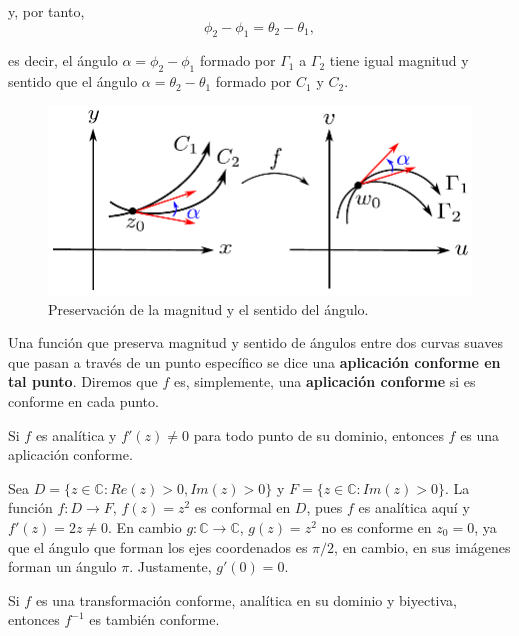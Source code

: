 y, por tanto,
$$\phi_2 - \phi_1 = \theta_2 - \theta_1,$$

es decir, el ángulo $\alpha = \phi_2 - \phi_1$ formado por $\Gamma_1$ a $\Gamma_2$ tiene igual magnitud y sentido que el ángulo $\alpha = \theta_2 - \theta_1$ formado por $C_1$ y $C_2$.

\begin{figure}[H]
    \centering
    \includegraphics[scale = 0.75]{Figuras/MapeoConforme2.pdf}
    \caption{Preservación de la magnitud y el sentido del ángulo.}
    \label{fig:Conforme2}
\end{figure}

\begin{defi}
Una función que preserva magnitud y sentido de ángulos entre dos curvas suaves que pasan a través de un punto específico se dice una \textbf{aplicación conforme en tal punto}. Diremos que $f$ es, simplemente, una \textbf{aplicación conforme} si es conforme en cada punto.
\end{defi}

\begin{teorema}
Si $f$ es analítica y $f'(z) \neq 0$ para todo punto de su dominio, entonces $f$ es una aplicación conforme.
\end{teorema}

\begin{ejemplo}
Sea $D = \{z \in \mathbb{C}: Re(z) > 0, Im(z) > 0 \}$ y $F = \{z \in \mathbb{C}: Im(z) > 0\}$. La función $f: D \rightarrow F$, $f(z) = z^2$ es conformal en $D$, pues $f$ es analítica aquí y $f'(z) = 2z \neq 0$. En cambio $g: \mathbb{C} \rightarrow \mathbb{C}$, $g(z) = z^2$ no es conforme en $z_0 = 0$, ya que el ángulo que forman los ejes coordenados es $\pi/2$, en cambio, en sus imágenes forman un ángulo $\pi$. Justamente, $g'(0) = 0$.
\end{ejemplo}

\begin{propo}
Si $f$ es una transformación conforme, analítica en su dominio y biyectiva, entonces $f^{-1}$ es también conforme.
\end{propo}

